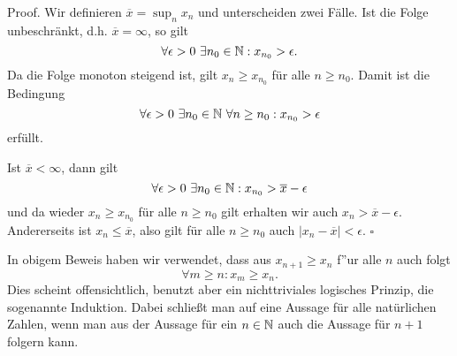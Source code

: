 \begin{emphBox}{}{}
Proof. Wir definieren \(\overline{x}= \sup_n x_n\) und unterscheiden zwei Fälle. Ist die Folge unbeschränkt, d.h. \(\overline{x}=\infty\), so gilt
\begin{equation*}
 \forall \epsilon > 0~\exists n_0 \in \mathbb{N}: x_{n_0} > \epsilon.\end{equation*}
Da die Folge monoton steigend ist, gilt \(x_n \geq x_{n_0}\) für alle \(n \geq n_0\). Damit ist die Bedingung
\begin{equation*}
 \forall \epsilon > 0~\exists n_0 \in \mathbb{N}~\forall n\geq n_0: x_{n_0} > \epsilon \end{equation*}
erfüllt.

Ist \(\overline{x} < \infty\), dann gilt
\begin{equation*}
 \forall \epsilon > 0~\exists n_0 \in \mathbb{N}: x_{n_0} > \overline{x} -\epsilon
\end{equation*}
und da wieder \(x_n \geq x_{n_0}\) für alle \(n \geq n_0\) gilt erhalten wir auch \( x_n > \overline{x}-\epsilon\). Andererseits ist \(x_n \leq \overline{x}\), also gilt für alle \(n \geq n_0\) auch \( \vert x_n - \overline{x} \vert < \epsilon. \)  \(\square\)
\end{emphBox}

In obigem Beweis haben wir verwendet, dass aus \(x_{n+1} \geq x_n\) f”ur alle \(n\) auch folgt
\begin{equation*}
 \forall m \geq n: x_m \geq x_n.\end{equation*}
Dies scheint offensichtlich, benutzt aber ein nichttriviales logisches Prinzip, die sogenannte Induktion. Dabei schließt man auf eine Aussage für alle natürlichen Zahlen, wenn man aus der Aussage für ein \(n \in \mathbb{N}\) auch die Aussage für \(n+1\) folgern kann.


